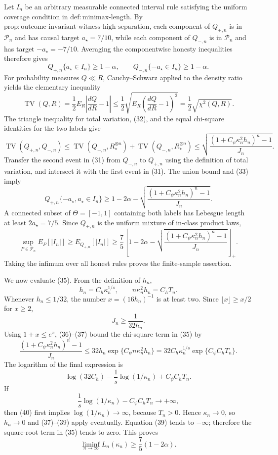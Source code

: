 Let \(I_n\) be an arbitrary measurable connected interval rule satisfying the uniform coverage condition in \(\mathrm{def:minimax\mbox{-}length}\).  By \(\mathrm{prop:outcome\mbox{-}invariant\mbox{-}witness\mbox{-}high\mbox{-}separation}\), each component of \(Q_{+,n}\) is in \(\mathcal P_n\) and has causal target \(a_\star=7/10\), while each component of \(Q_{-,n}\) is in \(\mathcal P_n\) and has target \(-a_\star=-7/10\).  Averaging the componentwise honesty inequalities therefore gives
\[
 Q_{+,n}\{a_\star\in I_n\}\ge1-\alpha,
 \qquad
 Q_{-,n}\{-a_\star\in I_n\}\ge1-\alpha.
 \tag{31}
\]
For probability measures \(Q\ll R\), Cauchy--Schwarz applied to the density ratio yields the elementary inequality
\[
 \operatorname{TV}(Q,R)
 =\frac12E_R\left|\frac{dQ}{dR}-1\right|
 \le\frac12\sqrt{E_R\left(\frac{dQ}{dR}-1\right)^2}
 =\frac12\sqrt{\chi^2(Q,R)}.
 \tag{32}
\]
The triangle inequality for total variation, (32), and the equal chi-square identities for the two labels give
\[
 \operatorname{TV}(Q_{+,n},Q_{-,n})
 \le\operatorname{TV}(Q_{+,n},R_\star^{\otimes n})
    +\operatorname{TV}(Q_{-,n},R_\star^{\otimes n})
 \le
 \sqrt{\frac{\left(1+C_\psi\kappa_n^2h_n\right)^n-1}{J_n}}.
 \tag{33}
\]
Transfer the second event in (31) from \(Q_{-,n}\) to \(Q_{+,n}\) using the definition of total variation, and intersect it with the first event in (31).  The union bound and (33) imply
\[
 Q_{+,n}\{-a_\star,a_\star\in I_n\}
 \ge1-2\alpha-
 \sqrt{\frac{\left(1+C_\psi\kappa_n^2h_n\right)^n-1}{J_n}}.
 \tag{34}
\]
A connected subset of \(\Theta=[-1,1]\) containing both labels has Lebesgue length at least \(2a_\star=7/5\).  Since \(Q_{+,n}\) is the uniform mixture of in-class product laws,
\[
 \sup_{P\in\mathcal P_n}E_P[|I_n|]
 \ge E_{Q_{+,n}}[|I_n|]
 \ge\frac75\left[
 1-2\alpha-
 \sqrt{\frac{\left(1+C_\psi\kappa_n^2h_n\right)^n-1}{J_n}}
 \right]_+.
 \tag{35}
\]
Taking the infimum over all honest rules proves the finite-sample assertion.

We now evaluate (35).  From the definition of \(h_n\),
\[
 h_n=C_h\kappa_n^{1/s},
 \qquad
 n\kappa_n^2h_n=C_hT_n.
 \tag{36}
\]
Whenever \(h_n\le1/32\), the number \(x=(16h_n)^{-1}\) is at least two.  Since \(\lfloor x\rfloor\ge x/2\) for \(x\ge2\),
\[
 J_n\ge\frac1{32h_n}.
 \tag{37}
\]
Using \(1+x\le e^x\), (36)--(37) bound the chi-square term in (35) by
\[
 \frac{\left(1+C_\psi\kappa_n^2h_n\right)^n-1}{J_n}
 \le32h_n\exp\{C_\psi n\kappa_n^2h_n\}
 =32C_h\kappa_n^{1/s}
   \exp\{C_\psi C_hT_n\}.
 \tag{38}
\]
The logarithm of the final expression is
\[
 \log(32C_h)-\frac1s\log(1/\kappa_n)+C_\psi C_hT_n.
 \tag{39}
\]
If
\[
 \frac1s\log(1/\kappa_n)-C_\psi C_hT_n\longrightarrow+\infty,
 \tag{40}
\]
then (40) first implies \(\log(1/\kappa_n)\to\infty\), because \(T_n>0\).  Hence \(\kappa_n\to0\), so \(h_n\to0\) and (37)--(39) apply eventually.  Equation (39) tends to \(-\infty\); therefore the square-root term in (35) tends to zero.  This proves
\[
 \liminf_{n\to\infty}L_n(\kappa_n)
 \ge\frac75(1-2\alpha).
 \tag{41}
\]

